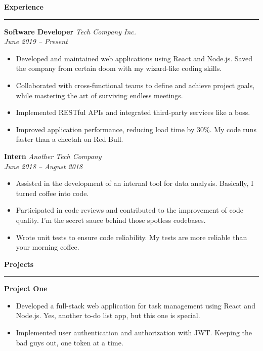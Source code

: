 \documentclass[a4paper,11pt]{article}
\newcommand{\sectiontitle}[1]{\textbf{\Large #1}\par\vspace{-1em}\noindent\rule{\linewidth}{0.3mm}\par\vspace{0.3em}}
\begin{document}
\begin{multicols}{2}
	\vspace{1em}

	\sectiontitle{Experience}

	\textbf{\large Software Developer} \hfill \textit{Tech Company Inc.}\\
	\textit{June 2019 -- Present}
	\begin{itemize}
		\item Developed and maintained web applications using React and Node.js. Saved the company from certain doom with my wizard-like coding skills.
		\item Collaborated with cross-functional teams to define and achieve project goals, while mastering the art of surviving endless meetings.
		\item Implemented RESTful APIs and integrated third-party services like a boss.
		\item Improved application performance, reducing load time by 30\%. My code runs faster than a cheetah on Red Bull.
	\end{itemize}
	\vspace{0.5em}

	\textbf{\large Intern} \hfill \textit{Another Tech Company}\\
	\textit{June 2018 -- August 2018}
	\begin{itemize}
		\item Assisted in the development of an internal tool for data analysis. Basically, I turned coffee into code.
		\item Participated in code reviews and contributed to the improvement of code quality. I'm the secret sauce behind those spotless codebases.
		\item Wrote unit tests to ensure code reliability. My tests are more reliable than your morning coffee.
	\end{itemize}

	\vspace{1em}

	\sectiontitle{Projects}

	\textbf{\large Project One}
	\begin{itemize}
		\item Developed a full-stack web application for task management using React and Node.js. Yes, another to-do list app, but this one is special.
		\item Implemented user authentication and authorization with JWT. Keeping the bad guys out, one token at a time.
	\end{itemize}
	\vspace{0.5em}


\end{multicols}
\end{document}
